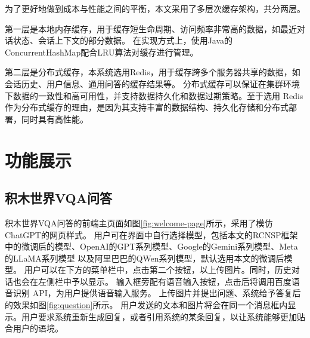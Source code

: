 为了更好地做到成本与性能之间的平衡，本文采用了多层次缓存架构，共分两层。

第一层是本地内存缓存，用于缓存短生命周期、访问频率非常高的数据，如最近对话状态、会话上下文的部分数据。
在实现方式上，使用Java的ConcurrentHashMap配合LRU算法对缓存进行管理。

第二层是分布式缓存，本系统选用Redis，用于缓存跨多个服务器共享的数据，如会话历史、用户信息、通用问答的缓存结果等。
分布式缓存可以保证在集群环境下数据的一致性和高可用性，并支持数据持久化和数据过期策略。至于选用
Redis作为分布式缓存的理由，是因为其支持丰富的数据结构、持久化存储和分布式部署，同时具有高性能。

\section{功能展示}
\subsection{积木世界VQA问答}
积木世界VQA问答的前端主页面如图\ref{fig:welcome-page}所示，采用了模仿ChatGPT的网页样式。
用户可在界面中自行选择模型，包括本文的RCNSP框架中的微调后的模型、OpenAI的GPT系列模型、Google的Gemini系列模型、Meta的LLaMA系列模型
以及阿里巴巴的QWen系列模型，默认选用本文的微调后模型。
用户可以在下方的菜单栏中，点击第二个按钮，以上传图片。同时，历史对话也会在左侧栏中予以显示。
输入框旁配有语音输入按钮，点击后将调用百度语音识别 API，为用户提供语音输入服务。
上传图片并提出问题、系统给予答复后的效果如图\ref{fig:question}所示。
用户发送的文本和图片将会在同一个消息框内显示。用户要求系统重新生成回复，或者引用系统的某条回复，以让系统能够更加贴合用户的语境。

